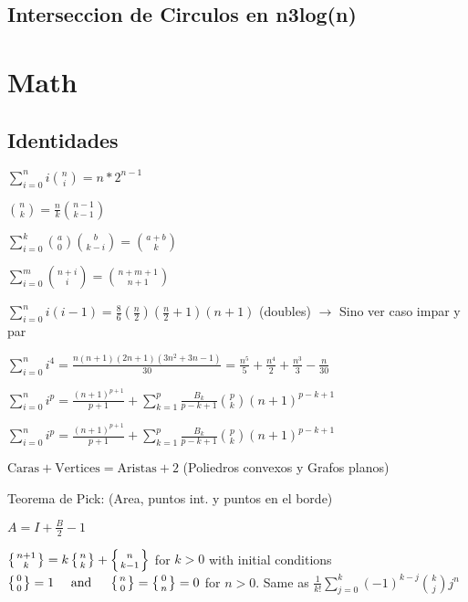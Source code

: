 \subsection{Interseccion de Circulos en n3log(n)}


\section{Math}%
\subsection{Identidades}
{

$\sum_{i=0}^n i\binom{n}{i}=n*2^{n-1}$

$\binom{n}{k}=\frac{n}{k}\binom{n-1}{k-1}$

$\sum_{i=0}^k \binom{a}{0}\binom{b}{k-i}=\binom{a+b}{k}$

$\sum_{i=0}^m \binom{n+i}{i}=\binom{n+m+1}{n+1}$




$\sum_{i=0}^n i(i-1) = \frac{8}{6}(\frac{n}{2})(\frac{n}{2}+1)(n+1)$ (doubles) $\rightarrow$ Sino ver caso impar y par


$\sum_{i=0}^n i^4 = \frac{n(n+1)(2n+1)(3n^2+3n-1)}{30} = \frac{n^5}{5} + \frac{n^4}{2} + \frac{n^3}{3} - \frac{n}{30}$

$\sum_{i=0}^n i^p = \frac{(n+1)^{p+1}}{p+1} + \sum_{k=1}^p\frac{B_k}{p-k+1}{p\choose k}(n+1)^{p-k+1}$

$\sum_{i=0}^n i^p = \frac{(n+1)^{p+1}}{p+1} + \sum_{k=1}^p\frac{B_k}{p-k+1}{p\choose k}(n+1)^{p-k+1}$

$\text{Caras} + \text{Vertices} = \text{Aristas} + 2$ (Poliedros convexos y Grafos planos)

Teorema de Pick: (Area, puntos int. y puntos en el borde)

$A=I+\frac{B}{2}-1$

$\left\{{n+1\atop k}\right\} = k \left\{{ n \atop k }\right\} + \left\{{n\atop k-1}\right\}$
for $k > 0$ with initial conditions
$\left\{{ 0 \atop 0 }\right\} = 1
\quad \mbox{ and } \quad
\left\{{ n \atop 0 }\right\} = \left\{{ 0 \atop n }\right\} = 0$
for $n > 0$.
Same as $\frac{1}{k!}\sum_{j=0}^{k}(-1)^{k-j}{k \choose j} j^n$

}
